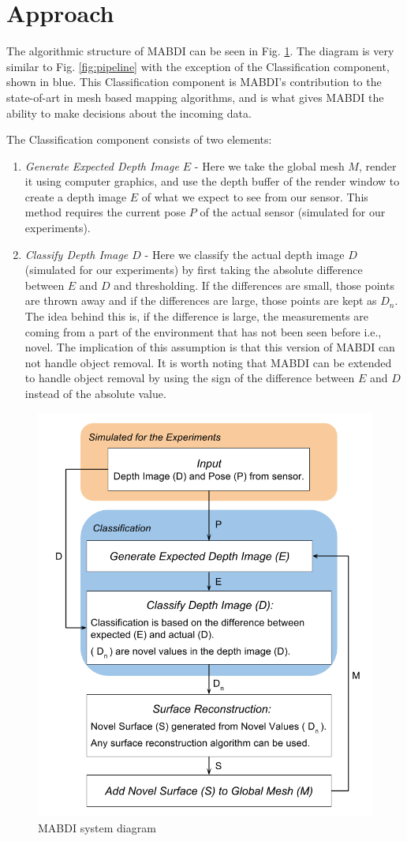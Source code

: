 \section{Approach}	\label{sec:related_works}

The algorithmic structure of MABDI can be seen in Fig. \ref{fig:system}. The
diagram is very similar to Fig. \ref{fig:pipeline} with the exception of the
Classification component, shown in blue. This Classification component is
MABDI's contribution to the state-of-art in mesh based mapping algorithms, and
is what gives MABDI the ability to make decisions about the incoming data.

The Classification component consists of two elements:
\begin{enumerate}
    \item \textit{Generate Expected Depth Image $E$} - Here we take the global
    mesh $M$, render it using computer graphics, and use the depth buffer of the
    render window to create a depth image $E$ of what we expect to see from our
    sensor. This method requires the current pose $P$ of the actual sensor
    (simulated for our experiments).
    \item \textit{Classify Depth Image $D$} - Here we classify the actual depth
    image $D$ (simulated for our experiments) by first taking the absolute
    difference between $E$ and $D$ and thresholding. If the differences are
    small, those points are thrown away and if the differences are large, those
    points are kept as $D_n$. The idea behind this is, if the difference is
    large, the measurements are coming from a part of the environment that has
    not been seen before i.e., novel. The implication of this assumption is that
    this version of MABDI can not handle object removal. It is worth noting
    that MABDI can be extended to handle object removal by using the sign of the
    difference between $E$ and $D$ instead of the absolute value.
\end{enumerate}

\begin{figure}[h]%
\centering
\includegraphics[width=.5\textwidth]{figures/diagram_system.png}
\caption{MABDI system diagram}
\label{fig:system}
\end{figure}

